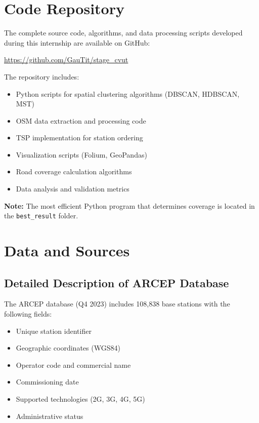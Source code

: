 \documentclass[12pt,a4paper]{report}
\begin{document}
\appendix

\chapter{Code Repository}

The complete source code, algorithms, and data processing scripts developed during this internship are available on GitHub:

\begin{center}
\url{https://github.com/GauTit/stage_cvut}
\end{center}

The repository includes:
\begin{itemize}
    \item Python scripts for spatial clustering algorithms (DBSCAN, HDBSCAN, MST)
    \item OSM data extraction and processing code
    \item TSP implementation for station ordering
    \item Visualization scripts (Folium, GeoPandas)
    \item Road coverage calculation algorithms
    \item Data analysis and validation metrics
\end{itemize}

\textbf{Note:} The most efficient Python program that determines coverage is located in the \texttt{best\_result} folder.

\chapter{Data and Sources}

\section{Detailed Description of ARCEP Database}

The ARCEP database (Q4 2023) includes 108,838 base stations with the following fields:
\begin{itemize}
    \item Unique station identifier
    \item Geographic coordinates (WGS84)
    \item Operator code and commercial name
    \item Commissioning date
    \item Supported technologies (2G, 3G, 4G, 5G)
    \item Administrative status
\end{itemize}
\end{document}
